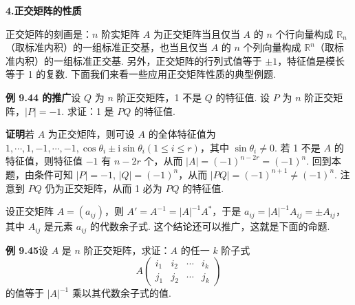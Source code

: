\documentclass[UTF8,12pt,a4paper,fontset=fandol]{ctexart}
\begin{document}
\noindent\textbf{4.\quad 正交矩阵的性质}

正交矩阵的刻画是：$n$ 阶实矩阵 $A$ 为正交矩阵当且仅当 $A$ 的 $n$ 个行向量构成 $\mathbb{R}_n$（取标准内积）的一组标准正交基，也当且仅当 $A$ 的 $n$ 个列向量构成 $\mathbb{R}^n$（取标准内积）的一组标准正交基. 另外，正交矩阵的行列式值等于 $\pm1$，特征值是模长等于 1 的复数. 下面我们来看一些应用正交矩阵性质的典型例题.

\noindent\textbf{例 9.44 的推广}\quad 设 $Q$ 为 $n$ 阶正交矩阵，1 不是 $Q$ 的特征值. 设 $P$ 为 $n$ 阶正交矩阵，$|P|=-1$. 求证：1 是 $PQ$ 的特征值.

\noindent\textbf{证明}\quad 若 $A$ 为正交矩阵，则可设 $A$ 的全体特征值为 $1,\cdots,1,-1,\cdots,-1,\cos\theta_i\pm\mathrm{i}\sin\theta_i(1\le i\le r)$，其中 $\sin\theta_i\ne0$. 若 1 不是 $A$ 的特征值，则特征值 $-1$ 有 $n-2r$ 个，从而 $|A|=(-1)^{n-2r}=(-1)^n$. 回到本题，由条件可知 $|P|=-1$, $|Q|=(-1)^n$，从而 $|PQ|=(-1)^{n+1}\ne(-1)^n$. 注意到 $PQ$ 仍为正交矩阵，从而 1 必为 $PQ$ 的特征值.

设正交矩阵 $A=(a_{ij})$，则 $A'=A^{-1}=|A|^{-1}A^*$，于是 $a_{ij}=|A|^{-1}A_{ij}=\pm A_{ij}$，其中 $A_{ij}$ 是元素 $a_{ij}$ 的代数余子式. 这个结论还可以推广，这就是下面的命题.

\noindent\textbf{例 9.45}\quad 设 $A$ 是 $n$ 阶正交矩阵，求证：$A$ 的任一 $k$ 阶子式
\[
A\begin{pmatrix}
i_1&i_2&\cdots&i_k\\
j_1&j_2&\cdots&j_k
\end{pmatrix}
\]
的值等于 $|A|^{-1}$ 乘以其代数余子式的值.
\end{document}

